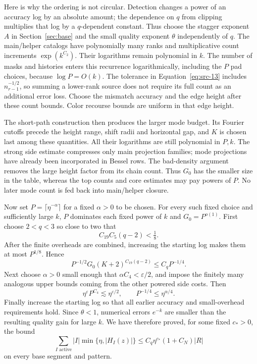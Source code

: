 Here is why the ordering is not circular.  Detection changes a power of
an accuracy log by an absolute amount; the dependence on $q$ from
clipping multiplies that log by a $q$-dependent constant.  Thus choose
the stagger exponent $A$ in Section~\ref{sec:base} and the small quality
exponent $\theta$ independently of $q$.  The main/helper catalogs have
polynomially many ranks and multiplicative count increments
$\exp(k^{C_2})$.  Their logarithms remain polynomial in $k$.
The number of masks and histories enters this recurrence logarithmically,
including the $P$ pad choices, because $\log P=O(k)$.  The tolerance in
Equation~\eqref{eq:src-13} includes $n_{r-1}^{-1/2}$, so summing a lower-rank
source does not require its full count as an additional error loss.
Choose the mismatch accuracy and the edge height after these count
bounds.  Color recourse bounds are uniform in that edge height.

The short-path construction then produces the larger mode budget.
Its Fourier cutoffs precede the height range, shift radii and horizontal
gap, and $K$ is chosen last among these quantities.  All their logarithms
are still polynomial in $P,k$.  The strong side estimate compresses only
main projection families; mode projections have already been incorporated
in Bessel rows.  The bad-density argument removes the large height
factor from its chain count.  Thus $G_0$ has the smaller size in the table,
whereas the top counts and core estimates may pay powers of $P$.
No later mode count is fed back into main/helper closure.

Now set $P=\lceil\eta^{-\alpha}\rceil$ for a fixed $\alpha>0$ to be
chosen.  For every such fixed choice and sufficiently large $k$,
$P$ dominates each fixed power of $k$ and $G_0=P^{o(1)}$.
First choose $2<q<3$ so close to two that
\[
 C_{19}C_5(q-2)<\tfrac18.
\]
After the finite overheads are combined, increasing the starting log
makes them at most $P^{1/8}$.  Hence
\[
 P^{-1/2}G_0(K+2)^{C_{19}(q-2)}\le C_qP^{-1/4}.
\]
Next choose $\alpha>0$ small enough that
$\alpha C_4<\varepsilon/2$, and impose the finitely many analogous
upper bounds coming from the other powered side costs.  Then
\[
 \eta^{\varepsilon}P^{C_4}\lesssim\eta^{\varepsilon/2},
 \qquad P^{-1/4}\le\eta^{\alpha/4}.
\]
Finally increase the starting log so that all earlier accuracy and
small-overhead requirements hold.  Since $\theta<1$, numerical errors
$e^{-k}$ are smaller than the resulting quality gain for large $k$.
We have therefore proved, for some fixed $c_*>0$, the bound
\[
 \sum_{I\text{ active}}|I|\min\{\eta,|H_I(z)|\}
 \le C_q\eta^{c_*}(1+C_N)|R|
\]
on every base segment and pattern.

